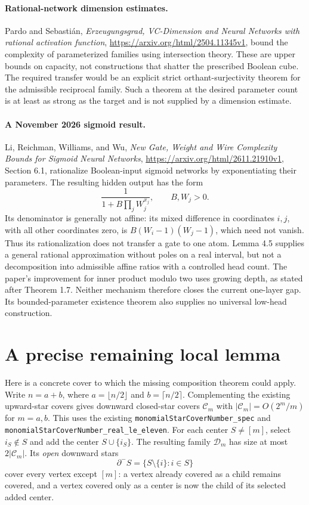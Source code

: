 \documentclass[11pt]{article}
\begin{document}
\paragraph{Rational-network dimension estimates.}
Pardo and Sebasti\'an, \emph{Erzeugungsgrad, VC-Dimension and Neural
Networks with rational activation function},
\url{https://arxiv.org/html/2504.11345v1}, bound the complexity of
parameterized families using intersection theory. These are upper
bounds on capacity, not constructions that shatter the prescribed
Boolean cube. The required transfer would be an explicit strict
orthant-surjectivity theorem for the admissible reciprocal family.
Such a theorem at the desired parameter count is at least as strong
as the target and is not supplied by a dimension estimate.

\paragraph{A November 2026 sigmoid result.}
Li, Reichman, Williams, and Wu, \emph{New Gate, Weight and Wire
Complexity Bounds for Sigmoid Neural Networks},
\url{https://arxiv.org/html/2611.21910v1}, Section 6.1, rationalize
Boolean-input sigmoid networks by exponentiating their parameters.
The resulting hidden output has the form
\[
 \frac1{1+B\prod_j W_j^{x_j}},\qquad B,W_j>0.
\]
Its denominator is generally not affine: its mixed difference in
coordinates $i,j$, with all other coordinates zero, is
$B(W_i-1)(W_j-1)$, which need not vanish. Thus its rationalization
does not transfer a gate to one atom. Lemma 4.5 supplies a general
rational approximation without poles on a real interval, but not
a decomposition into admissible affine ratios with a controlled
head count. The paper's improvement for inner product modulo two
uses growing depth, as stated after Theorem 1.7. Neither mechanism
therefore closes the current one-layer gap. Its bounded-parameter
existence theorem also supplies no universal low-head construction.

\section{A precise remaining local lemma}

Here is a concrete cover to which the missing composition theorem
could apply. Write $n=a+b$, where $a=\lfloor n/2\rfloor$ and
$b=\lceil n/2\rceil$. Complementing the existing upward-star
covers gives downward closed-star covers $\mathcal C_m$ with
$|\mathcal C_m|=O(2^m/m)$ for $m=a,b$. This uses the existing
\texttt{monomialStarCoverNumber\_spec} and
\texttt{monomialStarCoverNumber\_real\_le\_eleven}.
For each center $S\ne[m]$, select $i_S\notin S$ and add the
center $S\cup\{i_S\}$. The resulting family $\mathcal D_m$ has
size at most $2|\mathcal C_m|$. Its \emph{open} downward stars
\[
 \partial^- S=\{S\setminus\{i\}:i\in S\}
\]
cover every vertex except $[m]$: a vertex already covered as a child
remains covered, and a vertex covered only as a center is now the
child of its selected added center.
\end{document}
